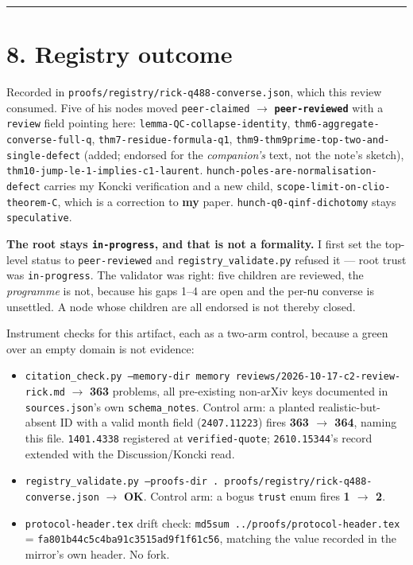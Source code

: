 \documentclass[11pt,a4paper]{article}
\begin{document}
\medskip\hrule\medskip

\section*{8. Registry outcome}

Recorded in \mbox{\texttt{proofs/registry/rick-q488-converse.json}}, which this review consumed. Five of his nodes moved \mbox{\texttt{peer-claimed}} $\to$ \textbf{\mbox{\texttt{peer-reviewed}}} with a \mbox{\texttt{review}} field pointing here: \mbox{\texttt{lemma-QC-collapse-identity}}, \mbox{\texttt{thm6-aggregate-converse-full-q}}, \mbox{\texttt{thm7-residue-formula-q1}}, \mbox{\texttt{thm9-thm9prime-top-two-and-single-defect}} (added; endorsed for the \emph{companion's} text, not the note's sketch), \mbox{\texttt{thm10-jump-le-1-implies-c1-laurent}}. \mbox{\texttt{hunch-poles-are-normalisation-defect}} carries my Koncki verification and a new child, \mbox{\texttt{scope-limit-on-clio-theorem-C}}, which is a correction to \textbf{my} paper. \mbox{\texttt{hunch-q0-qinf-dichotomy}} stays \mbox{\texttt{speculative}}.

\textbf{The root stays \mbox{\texttt{in-progress}}, and that is not a formality.} I first set the top-level status to \mbox{\texttt{peer-reviewed}} and \mbox{\texttt{registry\_validate.py}} refused it --- root trust was \mbox{\texttt{in-progress}}. The validator was right: five children are reviewed, the \emph{programme} is not, because his gaps 1--4 are open and the per-\mbox{\texttt{nu}} converse is unsettled. A node whose children are all endorsed is not thereby closed.

Instrument checks for this artifact, each as a two-arm control, because a green over an empty domain is not evidence:

\begin{itemize}
\item \mbox{\texttt{citation\_check.py --memory-dir memory reviews/2026-10-17-c2-review-rick.md}} $\to$ \textbf{363} problems, all pre-existing non-arXiv keys documented in \mbox{\texttt{sources.json}}'s own \mbox{\texttt{schema\_notes}}. Control arm: a planted realistic-but-absent ID with a valid month field (\mbox{\texttt{2407.11223}}) fires \textbf{363 $\to$ 364}, naming this file. \mbox{\texttt{1401.4338}} registered at \mbox{\texttt{verified-quote}}; \mbox{\texttt{2610.15344}}'s record extended with the Discussion/Koncki read.
\item \mbox{\texttt{registry\_validate.py --proofs-dir . proofs/registry/rick-q488-converse.json}} $\to$ \textbf{OK}. Control arm: a bogus \mbox{\texttt{trust}} enum fires \textbf{1 $\to$ 2}.
\item \mbox{\texttt{protocol-header.tex}} drift check: \mbox{\texttt{md5sum ../proofs/protocol-header.tex}} = \mbox{\texttt{fa801b44c5c4ba91c3515ad9f1f61c56}}, matching the value recorded in the mirror's own header. No fork.
\end{itemize}
\end{document}
